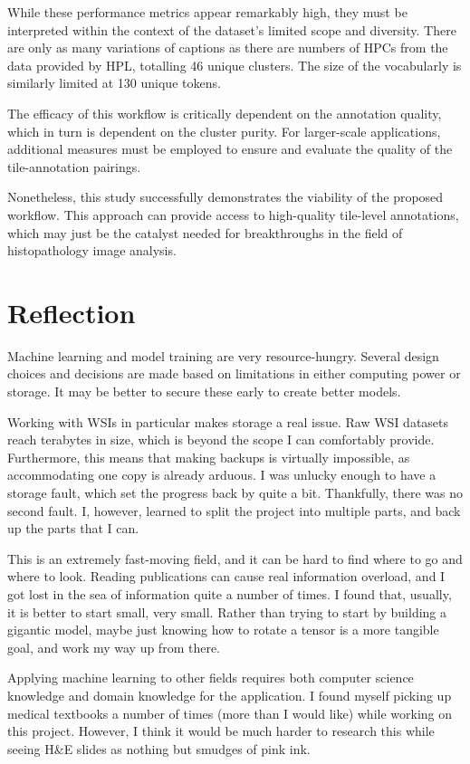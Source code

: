 \documentclass{l4proj}
\begin{document}
While these performance metrics appear remarkably high, they must be interpreted within the context of the dataset's limited scope and diversity. There are only as many variations of captions as there are numbers of HPCs from the data provided by HPL, totalling 46 unique clusters. The size of the vocabularly is similarly limited at 130 unique tokens.

The efficacy of this workflow is critically dependent on the annotation quality, which in turn is dependent on the cluster purity. For larger-scale applications, additional measures must be employed to ensure and evaluate the quality of the tile-annotation pairings.

Nonetheless, this study successfully demonstrates the viability of the proposed workflow. This approach can provide access to high-quality tile-level annotations, which may just be the catalyst needed for breakthroughs in the field of histopathology image analysis.

\section{Reflection}
Machine learning and model training are very resource-hungry. Several design choices and decisions are made based on limitations in either computing power or storage. It may be better to secure these early to create better models.

Working with WSIs in particular makes storage a real issue. Raw WSI datasets reach terabytes in size, which is beyond the scope I can comfortably provide. Furthermore, this means that making backups is virtually impossible, as accommodating one copy is already arduous. I was unlucky enough to have a storage fault, which set the progress back by quite a bit. Thankfully, there was no second fault. I, however, learned to split the project into multiple parts, and back up the parts that I can.

This is an extremely fast-moving field, and it can be hard to find where to go and where to look. Reading publications can cause real information overload, and I got lost in the sea of information quite a number of times. I found that, usually, it is better to start small, very small. Rather than trying to start by building a gigantic model, maybe just knowing how to rotate a tensor is a more tangible goal, and work my way up from there.

Applying machine learning to other fields requires both computer science knowledge and domain knowledge for the application. I found myself picking up medical textbooks a number of times (more than I would like) while working on this project. However, I think it would be much harder to research this while seeing H\&E slides as nothing but smudges of pink ink.
\end{document}
